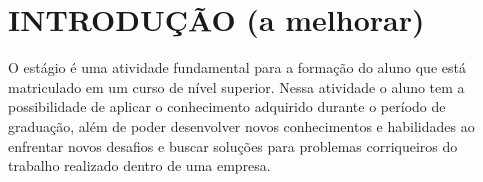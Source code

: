 \documentclass[
  12pt,				%
  openany,
  oneside,
  a4paper,			%
  english,			%
  brazil
]{article}
\numberwithin{figure}{section}
\numberwithin{table}{section}
\begin{document}

%
%
%
%
%


%
%
%



\begin{titlepage}

\begin{center}
  \begin{singlespace}
    \tableofcontents
  \end{singlespace}
\end{center}

\end{titlepage}



\section{INTRODUÇÃO (a melhorar)}

O estágio é uma atividade fundamental para a formação do aluno que está matriculado em um curso de nível superior. Nessa atividade o aluno tem a possibilidade de aplicar o conhecimento adquirido durante o período de graduação, além de poder desenvolver novos conhecimentos e habilidades ao enfrentar novos desafios e buscar soluções para problemas corriqueiros do trabalho realizado dentro de uma empresa.
\end{document}
